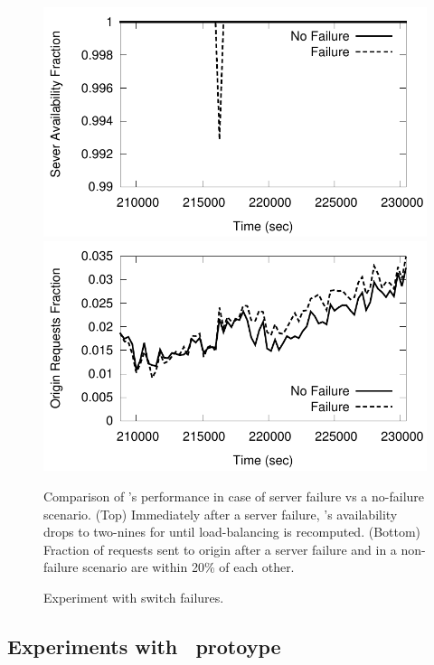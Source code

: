 \begin{figure}[tbp]
\includegraphics[scale=0.55]{energy/graphs/real/g8_serverfailure/cache-perf-denied.pdf}
\includegraphics[scale=0.55]{energy/graphs/real/g8_serverfailure/cache-perf-origin.pdf}
\caption{Comparison of \shrink's performance in case of server failure vs a no-failure scenario. (Top) Immediately after a server failure, \shrink's availability drops to two-nines for until load-balancing is recomputed.  (Bottom) Fraction of requests sent to origin after a server failure and in a non-failure scenario are within 20\% of each other.}
\end{figure}

\begin{figure}[tbp]
\vspace{1.5in}
\caption{Experiment with switch failures.}
\end{figure}

\subsection{Experiments with \shrink\ protoype}


